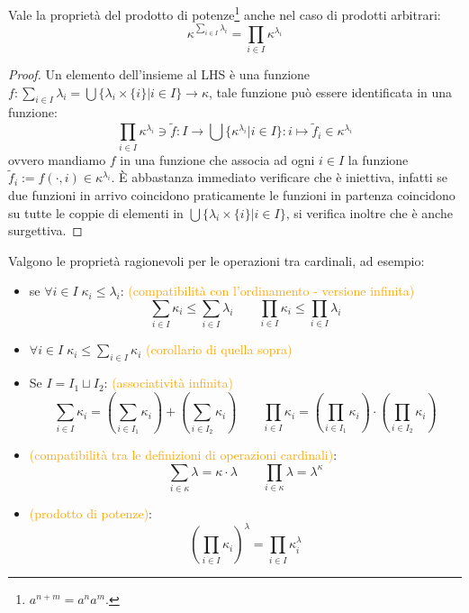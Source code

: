 \begin{remark}
	Vale la propriet\`a del prodotto di potenze\footnote{$a^{n+m} = a^na^m$.} anche nel caso di prodotti arbitrari:
	\[ \kappa^{\sum_{i \in I}\lambda_i} = \prod_{i \in I} \kappa^{\lambda_i}
		\]
\end{remark}

\begin{proof}
	Un elemento dell'insieme al LHS \`e una funzione $f : \sum_{i \in I} \lambda_i = \bigcup\{\lambda_i \times \{i\} | i \in I\} \rightarrow \kappa$,
	tale funzione pu\`o essere identificata in una funzione:
	\[ \prod_{i \in I}\kappa^{\lambda_i}\ni\widetilde{f} : I \rightarrow \bigcup\{\kappa^{\lambda_i} | i \in I\} : i \mapsto \widetilde{f}_i \in \kappa^{\lambda_i}
		\]
	ovvero mandiamo $f$ in una funzione che associa ad ogni $i \in I$ la funzione $\widetilde{f}_i := f(\cdot,i) \in \kappa^{\lambda_i}$. \`E abbastanza immediato verificare che \`e iniettiva, infatti se due funzioni in arrivo coincidono praticamente le funzioni in partenza coincidono su tutte le coppie di elementi 
	in $\bigcup\{\lambda_i \times \{i\} | i \in I\}$, si verifica inoltre che \`e anche surgettiva.
\end{proof}

\begin{exercise}
	Valgono le propriet\`a ragionevoli per le operazioni tra cardinali, ad esempio:
	\begin{itemize}
		\item se $\forall i \in I \; \kappa_i \leq \lambda_i$: \textcolor{orange}{(compatibilit\`a con l'ordinamento - versione infinita)}
		\[ \sum_{i \in I} \kappa_i \leq \sum_{i \in I} \lambda_i \qquad \prod_{i \in I} \kappa_i \leq \prod_{i \in I} \lambda_i
			\]
		\item $\forall i \in I \; \kappa_i \leq \sum_{i \in I} \kappa_i$ \textcolor{orange}{(corollario di quella sopra)}
		\item Se $I = I_1 \sqcup I_2$: \textcolor{orange}{(associativit\`a infinita)}
		\[ \sum_{i \in I} \kappa_i = \left(\sum_{i \in I_1} \kappa_i\right) + \left(\sum_{i \in I_2} \kappa_i\right) \qquad \prod_{i \in I}\kappa_i = \left(\prod_{i \in I_1} \kappa_i\right)\cdot\left(\prod_{i \in I_2} \kappa_i\right)
			\]
		\item \textcolor{orange}{(compatibilit\`a tra le definizioni di operazioni cardinali)}:
		\[ \sum_{i \in \kappa} \lambda = \kappa \cdot \lambda \qquad \prod_{i \in \kappa} \lambda = \lambda^\kappa
			\]
		\item \textcolor{orange}{(prodotto di potenze)}:
		\[ \left(\prod_{i \in I}\kappa_i\right)^\lambda = \prod_{i \in I} \kappa_i^\lambda
			\]
	\end{itemize}
\end{exercise}


